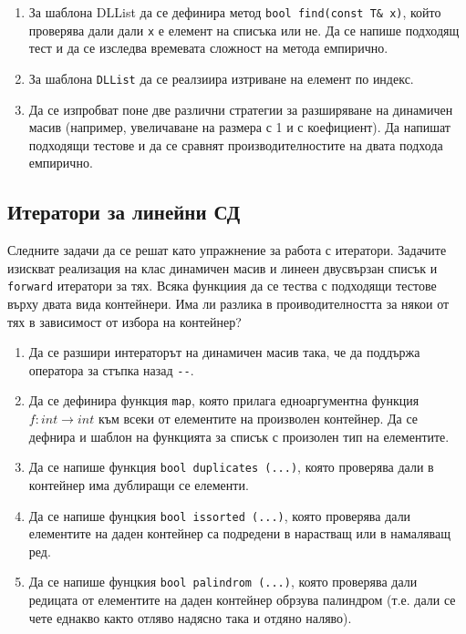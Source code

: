 \documentclass[12pt,a4paper]{article}
\newcommand{\code}[1]{\texttt{#1}}
\begin{document}
\begin{enumerate}[resume]

\item За шаблона DLList да се дефинира метод \texttt{bool find(const T\& x)}, който проверява дали дали \texttt{x} е елемент на списъка или не. Да се напише подходящ тест и да се изследва времевата сложност на метода емпирично.

\item За шаблона \texttt{DLList} да се реалзиира изтриване на елемент по индекс.

\item Да се изпробват поне две различни стратегии за разширяване на динамичен масив (например, увеличаване на размера с 1 и с коефициент). Да напишат подходящи тестове и да се сравнят производителностите на двата подхода емпирично.

\end{enumerate}

\subsection {Итератори за линейни СД}
\label{iterators1}
Следните задачи да се решат като упражнение за работа с итератори. Задачите изискват реализация на клас динамичен масив и линеен двусвързан списък и \code{forward} итератори за тях. Всяка функциия да се тества с подходящи тестове върху двата вида контейнери. Има ли разлика в проиводителността за някои от тях в зависимост от избора на контейнер?


\begin{enumerate}[resume]

	\item Да се разшири интераторът на динамичен масив така, че да поддържа оператора за стъпка назад \texttt{-{}-}.

	\item  Да се дефинира функция \code{map}, която прилага едноаргументна функция $f:int \rightarrow int$ към всеки от елементите на произволен контейнер. Да се дефнира и шаблон на функцията за списък с произолен тип на елементите.

	\item Да се напише функция \code{bool duplicates (...)}, която проверява дали в контейнер има дублиращи се елементи.

	\item Да се напише фунцкия \code{bool issorted (...)}, която проверява дали елементите на даден контейнер са подредени в нарастващ или в намаляващ ред.

	\item Да се напише фунцкия \code{bool palindrom (...)}, която проверява дали редицата от елементите на даден контейнер обрзува палиндром (т.е. дали се чете еднакво както отляво надясно така и отдяно наляво).

\end{enumerate}
\end{document}
